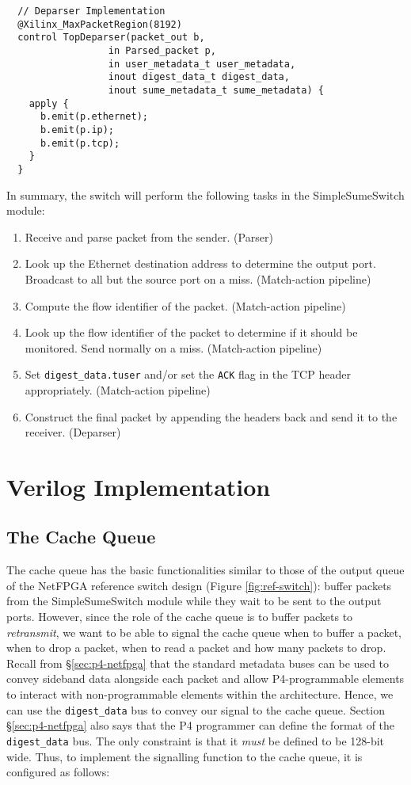 {\renewcommand{\baselinestretch}{0.8}\small
\begin{verbatim}
  // Deparser Implementation
  @Xilinx_MaxPacketRegion(8192)
  control TopDeparser(packet_out b,
                  in Parsed_packet p,
                  in user_metadata_t user_metadata,
                  inout digest_data_t digest_data, 
                  inout sume_metadata_t sume_metadata) { 
    apply {
      b.emit(p.ethernet); 
      b.emit(p.ip);
      b.emit(p.tcp);
    }
  }
\end{verbatim}
}

In summary, the switch will perform the following tasks in the SimpleSumeSwitch module:
\begin{enumerate}[label*=\arabic*., leftmargin=*, noitemsep]
	\item Receive and parse packet from the sender. (Parser)
	\item Look up the Ethernet destination address to determine the output port. Broadcast to all but the source port on a miss. (Match-action pipeline)
	\item Compute the flow identifier of the packet. (Match-action pipeline)
	\item Look up the flow identifier of the packet to determine if it should be monitored. Send normally on a miss. (Match-action pipeline)
	\item Set \texttt{digest\_data.tuser} and/or set the \texttt{ACK} flag in the TCP header appropriately. (Match-action pipeline)
	\item Construct the final packet by appending the headers back and send it to the receiver. (Deparser)
\end{enumerate}

\section{Verilog Implementation}
\label{sec:hw}
	\subsection{The Cache Queue}
The cache queue has the basic functionalities similar to those of the output queue of the NetFPGA reference switch design (Figure \ref{fig:ref-switch}): buffer packets from the SimpleSumeSwitch module while they wait to be sent to the output ports. However, since the role of the cache queue is to buffer packets to \textit{retransmit}, we want to be able to signal the cache queue when to buffer a packet, when to drop a packet, when to read a packet and how many packets to drop. Recall from \S\ref{sec:p4-netfpga} that the standard metadata buses can be used to convey sideband data alongside each packet and allow P4-programmable elements to interact with non-programmable elements within the architecture. Hence, we can use the \verb|digest_data| bus to convey our signal to the cache queue. Section \S\ref{sec:p4-netfpga} also says that the P4 programmer can define the format of the \verb|digest_data| bus. The only constraint is that it \textit{must} be defined to be 128-bit wide. Thus, to implement the signalling function to the cache queue, it is configured as follows:


